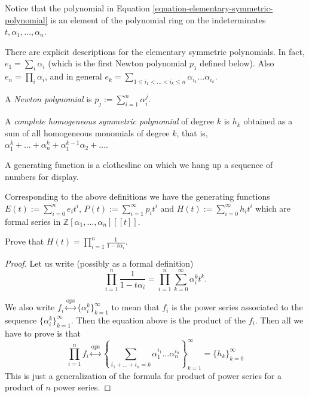 \noindent
Notice that the polynomial in Equation
\ref{equation-elementary-symmetric-polynomial} is an element of
the polynomial ring 
on the indeterminates $t,\alpha_1,\ldots,\alpha_n$.

There are explicit descriptions
for the elementary symmetric polynomials.
In fact, $e_1=\sum_i\alpha_i$ 
(which is the first Newton polynomial $p_1$ defined below).
Also $e_n=\prod_{i}\alpha_i$, and in general 
$e_k=\sum_{1\leq i_1<\ldots<i_k\leq n}\alpha_{i_1}\ldots\alpha_{i_k}$.

\begin{definition}
\label{definition-newton-polynomial}
A {\it Newton polynomial} is $p_j:=\sum_{i=1}^n\alpha_i^j$.
\end{definition}

\begin{definition}
\label{definition-complete-homogeneous-symmetric-polynomial}
A {\it complete homogeneous symmetric polynomial} of degree $k$ is $h_k$
obtained as a sum of all homogeneous monomials of degree $k$, that is,
$\alpha_1^k+\ldots+\alpha_n^k+\alpha_1^{k-1}\alpha_2+\ldots$.
\end{definition}

\begin{slogan}
\begin{reference}
\cite[p. 1]{generatingfunctionology}
\end{reference}
A generating function is a clothesline on which we hang up a sequence of numbers
for display.
\end{slogan}

\noindent
Corresponding to the above definitions we have the generating functions 
$E(t):=\sum_{i=0}^ne_it^i$, $P(t):=\sum_{i=1}^\infty p_it^i$ and 
$H(t):=\sum_{i=0}^\infty h_it^i$ which are formal series in 
$\mathbb{Z}[\alpha_1,\ldots,\alpha_n][\![t]\!]$.

\begin{exercise}
\label{exercise-H}
Prove that $H(t)=\prod_{i=1}^n\frac{1}{1-t\alpha_i}$.
\end{exercise}

\begin{proof}
Let us write (possibly as a formal definition)
$$
\prod_{i=1}^n\frac{1}{1-t\alpha_i}=\prod_{i=1}^n\sum_{k=0}^\infty\alpha_i^kt^k.
$$

We also write 
$f_i\overset{\text{ops}}{\longleftrightarrow}\{\alpha_i^k\}_{k=1}^\infty$ to mean
that $f_i$ is the power series associated to the sequence
$\{\alpha_i^k\}_{k=1}^\infty$. Then the equation above is the product of the
$f_i$. Then all we have to prove is that
$$
\prod_{i=1}^nf_i\overset{\text{ops}}{\longleftrightarrow}
\left\{\sum_{i_1+\ldots+i_n=k}\alpha_1^{i_1}\ldots\alpha_n^{i_n}\right\}
_{k=1}^\infty=\{h_k\}_{k=0}^\infty
$$
This is just a generalization of the formula for product of power series for a
product of $n$ power series.
\end{proof}


